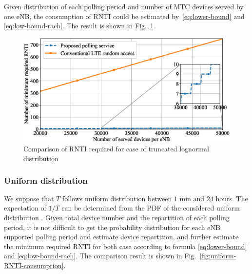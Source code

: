 Given distribution of each polling period and number of MTC devices served by one eNB, the consumption of RNTI could be estimated by~\eqref{eq:lower-bound} and \eqref{eq:low-bound-rach}. The result is shown in Fig.~\ref{fig:log-normal-RNTI-consumption}.
\begin{figure}[!t]
	\centering
	\includegraphics[width=\linewidth]{Chapter6/Figures/lognorm_RNTI_consumption_comparison.eps}
	\caption{Comparison of RNTI required for case of truncated lognormal distribution}
	\label{fig:log-normal-RNTI-consumption}
\end{figure}

\subsubsection{Uniform distribution}
We suppose that $T$ follows uniform distribution between $1$ min and $24$ hours. The expectation of $1/T$ can be determined from the PDF of the considered uniform distribution . Given total device number and the repartition of each polling period, it is not difficult to get the probability distribution for each eNB supported polling period and estimate device repartition, and further estimate the minimum required RNTI for both case according to formula \eqref{eq:lower-bound} and \eqref{eq:low-bound-rach}. The comparison result is shown in Fig.~\ref{fig:uniform-RNTI-consumption}.

